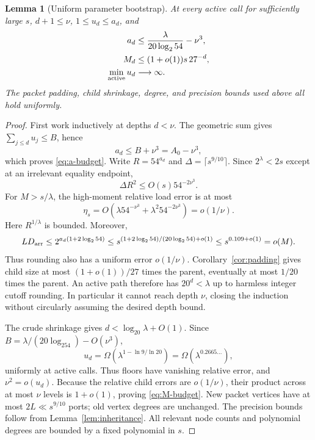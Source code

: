 \documentclass[11pt]{article}
\newtheorem{lemma}[theorem]{Lemma}
\theoremstyle{remark}\newtheorem{remark}[theorem]{Remark}
\newcommand{\Darr}{D_{\rm arr}}
\newcommand{\lp}{\log_2}
\begin{document}
\begin{lemma}[Uniform parameter bootstrap]
\label{lem:bootstrap}
At every active call for sufficiently large $s$, $d+1\le\nu$, $1\le u_d\le a_d$, and
\begin{align}
 a_d&\le\frac{\lambda}{20\lp54}-\nu^3,
 \label{eq:a-budget}\\
 M_d&\le (1+o(1))s\,27^{-d},
 \label{eq:M-budget}\\
 \min_{\rm active}u_d&\longrightarrow\infty.
 \label{eq:u-growth}
\end{align}
The packet padding, child shrinkage, degree, and precision bounds used above all hold uniformly.
\end{lemma}

\begin{proof}
First work inductively at depths $d<\nu$. The geometric sum gives $\sum_{j\le d}u_j\le B$, hence
\[
 a_d\le B+\nu^3=A_0-\nu^3,
\]
which proves \eqref{eq:a-budget}. Write $R=54^{a_d}$ and $\Delta=\lceil s^{9/10}\rceil$. Since $2^\lambda<2s$ except at an irrelevant equality endpoint,
\[
 \Delta R^2\le O(s)54^{-2\nu^3}.
\]
For $M>s/\lambda$, the high-moment relative load error is at most
\begin{equation}
 \eta_s=O\!\left(\lambda54^{-\nu^3}
                   +\lambda^2 54^{-2\nu^3}\right)=o(1/\nu).
 \label{eq:eta}
\end{equation}
Here $R^{1/\lambda}$ is bounded. Moreover,
\[
 L\Darr\le2^{a_d(1+2\lp54)}
 \le s^{(1+2\lp54)/(20\lp54)+o(1)}\le s^{0.109+o(1)}=o(M).
\]
Thus rounding also has a uniform error $o(1/\nu)$. Corollary~\ref{cor:padding} gives child size at most $(1+o(1))/27$ times the parent, eventually at most $1/20$ times the parent. An active path therefore has $20^d<\lambda$ up to harmless integer cutoff rounding. In particular it cannot reach depth $\nu$, closing the induction without circularly assuming the desired depth bound.

The crude shrinkage gives $d<\log_{20}\lambda+O(1)$. Since $B=\lambda/(20\lp54)-O(\nu^3)$,
\[
 u_d=\Omega\!\left(\lambda^{1-\ln9/\ln20}\right)
 =\Omega(\lambda^{0.2665\ldots}),
\]
uniformly at active calls. Thus floors have vanishing relative error, and $\nu^2=o(u_d)$. Because the relative child errors are $o(1/\nu)$, their product across at most $\nu$ levels is $1+o(1)$, proving \eqref{eq:M-budget}. New packet vertices have at most $2L\ll s^{9/10}$ ports; old vertex degrees are unchanged. The precision bounds follow from Lemma~\ref{lem:inheritance}. All relevant node counts and polynomial degrees are bounded by a fixed polynomial in $s$.
\end{proof}
\end{document}
